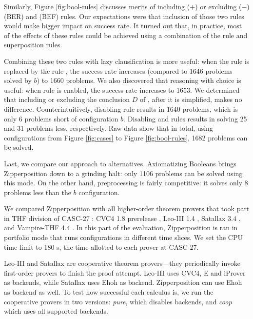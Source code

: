 Similarly, Figure \ref{fig:bool-rules} discusses merits of including ($+$) or
excluding ($-$)  (BER) and  (BEF) rules. Our
expectations were that inclusion of those two rules would make bigger impact on
success rate. It turned out that, in practice, most of the effects of these
rules could be achieved using a combination of the  rule and
superposition rules.
\pagebreak[2]

Combining these two rules with lazy clausification is more useful: when the rule
 is replaced by the rule , the success rate increases
(compared to 1646 problems solved by $b$) to 1660 problems. We also discovered
that reasoning with choice is useful: when rule  is enabled, the
success rate increases to 1653. We determined that including or excluding the
conclusion $D$ of , after it is simplified, makes no difference.
Counterintuitively, disabling  rule results in 1640 problems,
which is only 6 problems short of configuration $b$. Disabling  and
 rules results in solving 25 and 31 problems less,
respectively. Raw data show that in total, using configurations from Figure
\ref{fig:cases} to Figure \ref{fig:bool-rules}, 1682 problems can be solved.

Last, we compare our approach to alternatives. Axiomatizing Booleans brings
Zipperposition down to a grinding halt: only 1106 problems can be solved using
this mode. On the other hand, preprocessing is fairly competitive: it solves
only 8 problems less than the $b$ configuration.



We compared Zipperposition with all higher-order theorem provers that took part
in THF division of CASC-27 \cite{gs-19-casc27}: CVC4 1.8 prerelease \cite{cbetal-11-cvc4},
Leo-III 1.4 \cite{sb-21-leo3}, Satallax 3.4
\cite{cb-12-satallax}, and Vampire-THF 4.4
\cite{lkav-13-vampire}. In this part of the evaluation, Zipperposition is ran
in portfolio mode that runs configurations in different time slices. 
We set the CPU time limit to 180 s, the time allotted to each prover at CASC-27.


Leo-III and Satallax are cooperative theorem provers---they periodically invoke
first-order provers to finish the proof attempt. Leo-III uses CVC4, E and
iProver \cite{kk-08-iprover} as backends, while Satallax uses Ehoh
 as backend. Zipperposition can use Ehoh as backend as well. To test how successful each calculus is, we run
the cooperative provers in two versions: \emph{pure}, which disables backends,
and \emph{coop} which uses all supported backends.



